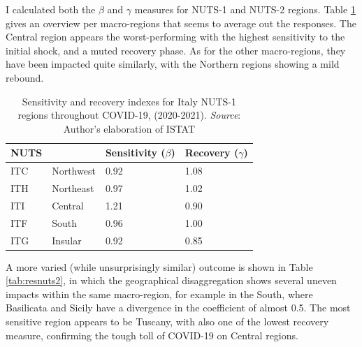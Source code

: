 \documentclass[12pt]{article}
\begin{document}
I calculated both the \textit{$\beta$} and \textit{$\gamma$} measures for NUTS-1 and NUTS-2 regions. Table \ref{tab:resnuts1} gives an overview per macro-regions that seems to average out the responses. The Central region appears the worst-performing with the highest sensitivity to the initial shock, and a muted recovery phase. As for the other macro-regions, they have been impacted quite similarly, with the Northern regions showing a mild rebound.


\begin{table}[h]
    \begin{center}
    \begin{tabular}{@{}llll@{}}
    \toprule[0.5pt]
    NUTS      &      & Sensitivity (\textit{$\beta$}) & Recovery (\textit{$\gamma$}) \\ \midrule[0.5pt]
    ITC      & Northwest & 0.92       & 1.08     \\
    ITH      & Northeast & 0.97       & 1.02     \\
    ITI      & Central   & 1.21       & 0.90     \\
    ITF      & South     & 0.96       & 1.00     \\
    ITG      & Insular   & 0.92       & 0.85     \\ \bottomrule[0.5pt]
    \end{tabular}
    \end{center}
    \caption{Sensitivity and recovery indexes for Italy NUTS-1 regions throughout COVID-19, (2020-2021). \textit{Source}: Author's elaboration of ISTAT \citeyear{istat}}
    \label{tab:resnuts1}
\end{table}

A more varied (while unsurprisingly similar) outcome is shown in Table \ref{tab:resnuts2}, in which the geographical disaggregation shows several uneven impacts within the same macro-region, for example in the South, where Basilicata and Sicily have a divergence in the coefficient of almost 0.5. The most sensitive region appears to be Tuscany, with also one of the lowest recovery measure, confirming the tough toll of COVID-19 on Central regions.
\end{document}

